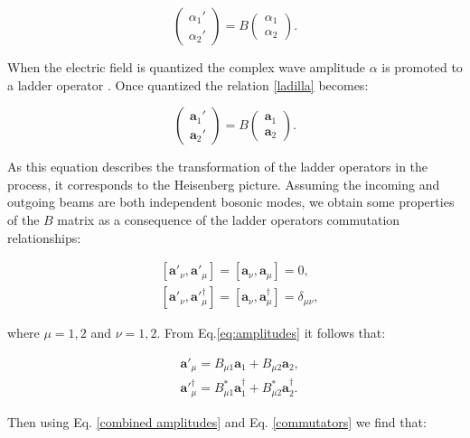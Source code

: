\documentclass{book}
\begin{document}
\begin{equation}
\begin{pmatrix} \alpha_{1}' \\ \alpha_{2}' \end{pmatrix}=B\begin{pmatrix} \alpha_{1} \\ \alpha_{2} \end{pmatrix}. \label{ladilla}
\end{equation}

When the electric field  is quantized the complex wave amplitude $\alpha$ is promoted to a ladder operator \cite{ludon}. Once quantized the relation \ref{ladilla} becomes:

\begin{equation}
\begin{pmatrix} \mathbf{a}_{1}' \\ \mathbf{a}_{2}' \end{pmatrix}=B\begin{pmatrix} \mathbf{a}_{1} \\ \mathbf{a}_{2} \end{pmatrix}.
\label{eq:amplitudes}
\end{equation}

As this equation describes the transformation of the ladder operators in the process, it corresponds to the Heisenberg picture. Assuming the incoming and outgoing beams are both independent bosonic modes, we obtain some properties of the $B$ matrix as a consequence of the ladder operators commutation relationships:

\begin{align}
&[\mathbf{a}'_{\nu},\mathbf{a}'_{\mu}]=[\mathbf{a}_{\nu},\mathbf{a}_{\mu}]=0,\\
&[\mathbf{a}'_{\nu},\mathbf{a}'^{\dagger}_{\mu}]=[\mathbf{a}_{\nu},\mathbf{a}^{\dagger}_{\mu}]=\delta_{\mu \nu},
\label{commutators}
\end{align}

where $\mu=1,2$ and $\nu=1,2$. From Eq.\ref{eq:amplitudes} it follows that:

\begin{align}
&\mathbf{a}'_{\mu}=B_{\mu 1}\mathbf{a}_{1}+B_{\mu 2} \mathbf{a}_{2}, \\
&\mathbf{a}'^{\dagger}_{\mu}=B_{\mu 1}^{*}\mathbf{a}^{\dagger}_{1}+B_{\mu 2}^{*} \mathbf{a}^{\dagger}_{2}.
\label{combined amplitudes}
\end{align}

Then using Eq. \ref{combined amplitudes} and Eq. \ref{commutators} we find that:
\end{document}
